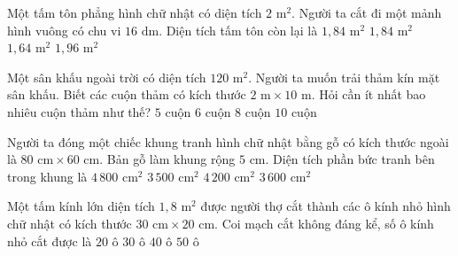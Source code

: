 \begin{ex} %
Một tấm tôn phẳng hình chữ nhật có diện tích $2\text{ m}^2$. Người ta cắt đi một mảnh hình vuông có chu vi $16\text{ dm}$. Diện tích tấm tôn còn lại là
\choice
{$1{,}84\text{ m}^2$}
{\True $1{,}84\text{ m}^2$}
{$1{,}64\text{ m}^2$}
{$1{,}96\text{ m}^2$}
\end{ex}

\begin{ex} %
Một sân khấu ngoài trời có diện tích $120\text{ m}^2$. Người ta muốn trải thảm kín mặt sân khấu. Biết các cuộn thảm có kích thước $2\text{ m} \times 10\text{ m}$. Hỏi cần ít nhất bao nhiêu cuộn thảm như thế?
\choice
{$5$ cuộn}
{\True $6$ cuộn}
{$8$ cuộn}
{$10$ cuộn}
\end{ex}

\begin{ex} %
Người ta đóng một chiếc khung tranh hình chữ nhật bằng gỗ có kích thước ngoài là $80\text{ cm} \times 60\text{ cm}$. Bản gỗ làm khung rộng $5\text{ cm}$. Diện tích phần bức tranh bên trong khung là
\choice
{$4\,800\text{ cm}^2$}
{\True $3\,500\text{ cm}^2$}
{$4\,200\text{ cm}^2$}
{$3\,600\text{ cm}^2$}
\end{ex}

\begin{ex} %
Một tấm kính lớn diện tích $1{,}8\text{ m}^2$ được người thợ cắt thành các ô kính nhỏ hình chữ nhật có kích thước $30\text{ cm} \times 20\text{ cm}$. Coi mạch cắt không đáng kể, số ô kính nhỏ cắt được là
\choice
{$20$ ô}
{\True $30$ ô}
{$40$ ô}
{$50$ ô}
\end{ex}

